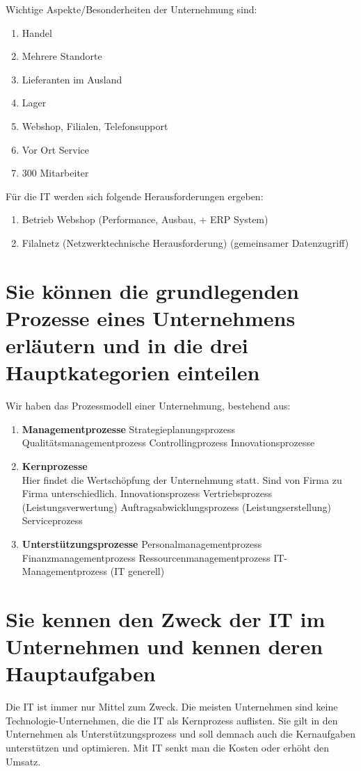 Wichtige Aspekte/Besonderheiten der Unternehmung sind:
\begin{enumerate}
	\item Handel
	\item Mehrere Standorte
	\item Lieferanten im Ausland
	\item Lager
	\item Webshop, Filialen, Telefonsupport
	\item Vor Ort Service
	\item 300 Mitarbeiter
\end{enumerate}

Für die IT werden sich folgende Herausforderungen ergeben:
\begin{enumerate}
	\item Betrieb Webshop (Performance, Ausbau, + ERP System)
	\item Filalnetz (Netzwerktechnische Herausforderung) (gemeinsamer Datenzugriff)
\end{enumerate}
\section{Sie können die grundlegenden Prozesse eines Unternehmens erläutern und in die drei Hauptkategorien einteilen}
Wir haben das Prozessmodell einer Unternehmung, bestehend aus:
\begin{enumerate}
	\item \textbf{Managementprozesse}
		\subitem Strategieplanungsprozess
		\subitem Qualitätsmanagementprozess
		\subitem Controllingprozess
		\subitem Innovationsprozesse
	\item \textbf{Kernprozesse} \\
		Hier findet die Wertschöpfung der Unternehmung statt. Sind von Firma zu Firma unterschiedlich.
		\subitem Innovationsprozess
		\subitem Vertriebsprozess (Leistungsverwertung)
		\subitem Auftragsabwicklungsprozess (Leistungserstellung)
		\subitem Serviceprozess
	\item \textbf{Unterstützungsprozesse}
		\subitem Personalmanagementprozess
		\subitem Finanzmanagementprozess
		\subitem Ressourcenmanagementprozess
		\subitem IT-Managementprozess (IT generell)
\end{enumerate}

\section{Sie kennen den Zweck der IT im Unternehmen und kennen deren Hauptaufgaben}
Die IT ist immer nur Mittel zum Zweck. Die meisten Unternehmen sind keine
Technologie-Unternehmen, die die IT als Kernprozess auflisten.
Sie gilt in den Unternehmen als Unterstützungsprozess und soll demnach auch
die Kernaufgaben unterstützen und optimieren. Mit IT senkt man die Kosten
oder erhöht den Umsatz.